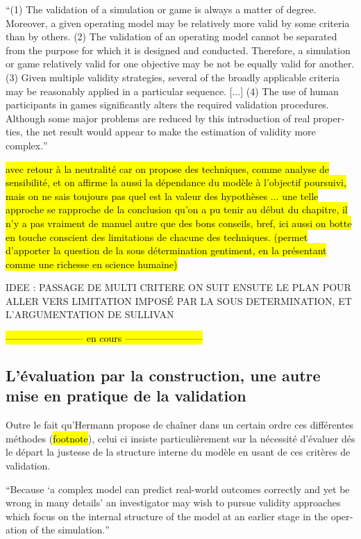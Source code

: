 \foreignquote{english}{(1) The validation of a simulation or game is always a matter of degree. Moreover, a given operating model may be relatively more valid by some criteria than by others. (2) The validation of an operating model cannot be separated from the purpose for which it is designed and conducted. Therefore, a simulation or game relatively valid for one objective may be not be equally valid for another. (3) Given multiple validity strategies, several of the broadly applicable criteria may be reasonably applied in a particular sequence. [...] (4) The use of human participants in games significantly alters the required validation procedures. Although some major problems are reduced by this introduction of real properties, the net result would appear to make the estimation of validity more complex.} \textcite{Hermann1967}


\hl{ avec retour à la neutralité car on propose des techniques, comme analyse de sensibilité, et on affirme la aussi la dépendance du modèle à l'objectif poursuivi, mais on ne sais toujours pas quel est la valeur des hypothèses ... une telle approche se rapproche de la conclusion qu'on a pu tenir au début du chapitre, il n'y a pas vraiment de manuel autre que des bons conseils, bref, ici aussi on botte en touche conscient des limitations de chacune des techniques. (permet d'apporter la question de la sous détermination gentiment, en la présentant comme une richesse en science humaine)}


IDEE : PASSAGE DE MULTI CRITERE ON SUIT ENSUTE LE PLAN POUR ALLER VERS LIMITATION IMPOSÉ PAR LA SOUS DETERMINATION, ET L'ARGUMENTATION DE SULLIVAN

\hl{------------------------ en cours ------------------------}

\subsection{L'évaluation par la construction, une autre mise en pratique de la validation}

Outre le fait qu'Hermann propose de chaîner dans un certain ordre ces différentes méthodes (\hl{footnote}), celui ci insiste particulièrement sur la nécessité d'évaluer dés le départ la justesse de la structure interne du modèle en usant de ces critères de validation.

\foreignquote{english}{Because \enquote{a complex model can predict real-world outcomes correctly and yet be wrong in many details} \autocite[64]{Pool1965} an investigator may wish to pursue validity approaches which focus on the internal structure of the model at an earlier stage in the operation of the simulation.} \autocite[226]{Hermann1967}

